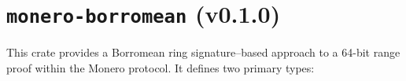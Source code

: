 \documentclass[12pt,a4paper]{article}
\begin{document}




\section{\texttt{monero-borromean} (v0.1.0)}
\label{sec:monero_borromean}

This crate provides a Borromean ring signature--based approach to a 64-bit range proof within the Monero protocol. It defines two primary types:
\end{document}
